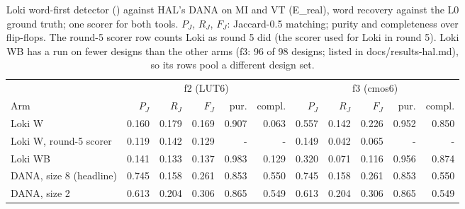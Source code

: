 \begin{table}[t]
\caption{Loki word-first detector () against HAL's DANA on MI and VT (E\_real), word recovery against the L0 ground truth; one scorer for both tools. $P_J$, $R_J$, $F_J$: Jaccard-0.5 matching; purity and completeness over flip-flops. The round-5 scorer row counts Loki as round 5 did (the scorer used for Loki in round 5). Loki WB has a run on fewer designs than the other arms (f3: 96 of 98 designs; listed in docs/results-hal.md), so its rows pool a different design set.}
\label{tab:hal}
\centering
\footnotesize
\begin{tabular}{@{}lrrrrrrrrrr@{}}
\toprule
 & \multicolumn{5}{c}{f2 (LUT6)} & \multicolumn{5}{c}{f3 (cmos6)} \\
\cmidrule(lr){2-6}\cmidrule(lr){7-11}
Arm & $P_J$ & $R_J$ & $F_J$ & pur. & compl. & $P_J$ & $R_J$ & $F_J$ & pur. & compl. \\
\midrule
Loki W & 0.160 & 0.179 & 0.169 & 0.907 & 0.063 & 0.557 & 0.142 & 0.226 & 0.952 & 0.850 \\
Loki W, round-5 scorer & 0.119 & 0.142 & 0.129 & - & - & 0.149 & 0.042 & 0.065 & - & - \\
Loki WB & 0.141 & 0.133 & 0.137 & 0.983 & 0.129 & 0.320 & 0.071 & 0.116 & 0.956 & 0.874 \\
DANA, size 8 (headline) & 0.745 & 0.158 & 0.261 & 0.853 & 0.550 & 0.745 & 0.158 & 0.261 & 0.853 & 0.550 \\
DANA, size 2 & 0.613 & 0.204 & 0.306 & 0.865 & 0.549 & 0.613 & 0.204 & 0.306 & 0.865 & 0.549 \\
\bottomrule
\end{tabular}
\end{table}
